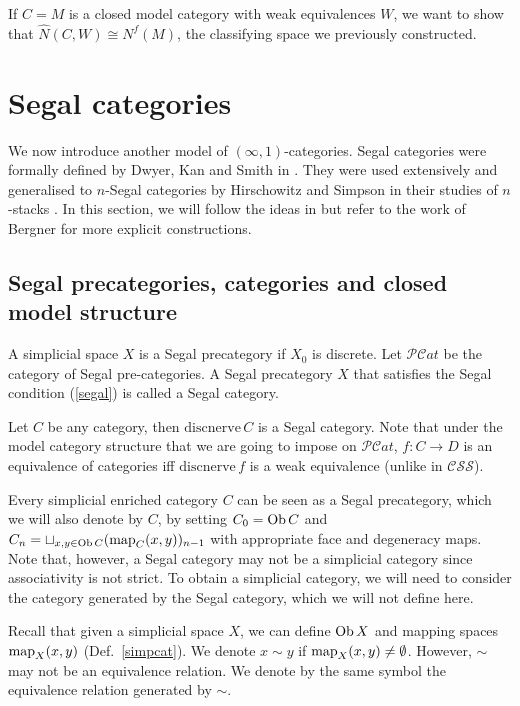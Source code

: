 \begin{refsection}
If $C=M$ is a closed model category with weak equivalences $W$, we want to show that $\hat N(C,W)\cong N^f(M)$, the classifying space we previously constructed.


\section{Segal categories}
We now introduce another model of $(\infty,1)$-categories. Segal categories were formally defined by Dwyer, Kan and Smith in \cite{dks}. They were used extensively and generalised to $n$-Segal categories by Hirschowitz and Simpson in their studies of $n$-stacks \cite{hs}. In this section, we will follow the ideas in \cite{hs} but refer to the work of Bergner \cite{bergner2} for more explicit constructions. 

\subsection{Segal precategories, categories and closed model structure}
\begin{defin}
A simplicial space $X$ is a Segal precategory if $X_0$ is discrete. Let $\mathcal{PC}at$ be the category of Segal pre-categories. A Segal precategory $X$ that satisfies the Segal condition (\ref{segal}) is called a Segal category.
\end{defin}

\begin{eg}
Let $C$ be any category, then $\mathrm{discnerve}\,C$ is a Segal category. Note that under the model category structure that we are going to impose on $\mathcal{PC}at$, $f:C\to D$ is an equivalence of categories iff $\mathrm{discnerve}\,f$ is a weak equivalence (unlike in $\mathcal{CSS}$).
\end{eg}

Every simplicial enriched category $C$ can be seen as a Segal precategory, which we will also denote by $C$, by setting $C_0=\operatorname{Ob} C$ and $C_n=\sqcup_{x,y\in\operatorname{Ob} C}(\operatorname{\mathrm{map}}_C(x,y))_{n-1}$ with appropriate face and degeneracy maps. Note that, however, a Segal category may not be a simplicial category since associativity is not strict. To obtain a simplicial category, we will need to consider the category generated by the Segal category, which we will not define here.

Recall that given a simplicial space $X$, we can define $\operatorname{Ob} X$ and mapping spaces $\operatorname{\mathrm{map}}_X(x,y)$ (Def.~\ref{simpcat}). We denote $x\sim y$ if $\operatorname{\mathrm{map}}_X(x,y)\ne\emptyset$. However, $\sim$ may not be an equivalence relation. We denote by the same symbol the equivalence relation generated by $\sim$.


\end{refsection}
